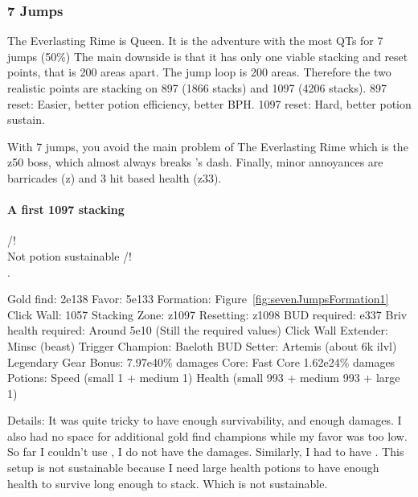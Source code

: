 \documentclass{article}
\begin{document}
\subsubsection{7 Jumps}

The Everlasting Rime is Queen.
It is the adventure with the most QTs for 7 jumps (50\%)
The main downside is that it has only one viable stacking and reset points, that is 200 areas apart.
The jump loop is 200 areas.
Therefore the two realistic points are stacking on 897 (1866 stacks) and 1097 (4206 stacks).
897 reset: Easier, better potion efficiency, better BPH.
1097 reset: Hard, better potion sustain.

With 7 jumps, you avoid the main problem of The Everlasting Rime which is the z50 boss, which almost always breaks \shandie's dash.
Finally, minor annoyances are barricades (z) and 3 hit based health (z33).


\paragraph{A first 1097 stacking}

/!\\ Not potion sustainable /!\\.

Gold find: 2e138\newline
Favor: 5e133\newline
Formation: Figure~\ref{fig:sevenJumpsFormation1}\newline
Click Wall: 1057\newline
Stacking Zone: z1097\newline
Resetting: z1098\newline
BUD required: e337\newline
Briv health required: Around 5e10 (Still the required values)\newline
Click Wall Extender: Minsc (beast)\newline
Trigger Champion: Baeloth\newline
BUD Setter: Artemis (about 6k ilvl)\newline
Legendary Gear Bonus: 7.97e40\% damages\newline
Core: Fast Core 1.62e24\% damages\newline
Potions: Speed (small 1 + medium 1) Health (small 993 + medium 993 + large 1)

Details:
It was quite tricky to have enough survivability, and enough damages.
I also had no space for additional gold find champions while my favor was too low.
So far I couldn't use \widdle, I do not have the damages.
Similarly, I had to have \tyril.
This setup is not sustainable because I need large health potions to have enough health to survive long enough to stack.
Which is not sustainable.
\end{document}
